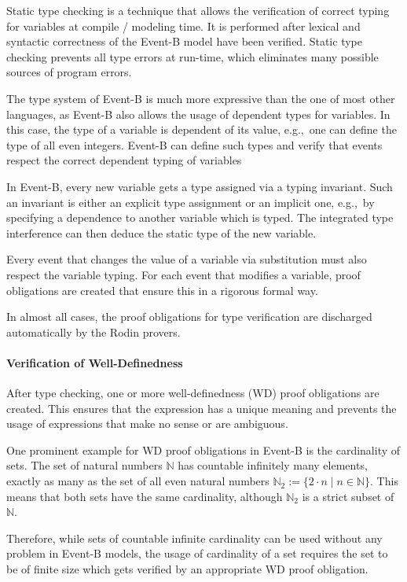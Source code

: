 Static type checking is a technique that allows the verification of correct
typing for variables at compile / modeling time. It is performed after lexical
and syntactic correctness of the Event-B model have been verified. Static type
checking prevents all type errors at run-time, which eliminates many possible
sources of program errors.

The type system of Event-B is much more expressive than the one of most other
languages, as Event-B also allows the usage of dependent types for variables. In
this case, the type of a variable is dependent of its value, e.g.,\ one can
define the type of all even integers. Event-B can define such types and verify
that events respect the correct dependent typing of variables

In Event-B, every new variable gets a type assigned via a typing invariant. Such
an invariant is either an explicit type assignment or an implicit one, e.g.,\ by
specifying a dependence to another variable which is typed. The integrated type
interference can then deduce the static type of the new variable.

Every event that changes the value of a variable via substitution must also
respect the variable typing. For each event that modifies a variable,  proof
obligations are created that ensure this in a rigorous formal way.

In almost all cases, the proof obligations for type verification are discharged
automatically by the Rodin provers.

\paragraph{Verification of Well-Definedness}
\label{sec:verif-well-defin}

After type checking, one or more well-definedness (WD) proof obligations are
created. This ensures that the expression has a unique meaning and prevents the
usage of expressions that make no sense or are ambiguous.

One prominent example for WD proof obligations in Event-B is the cardinality of
sets. The set of natural numbers $\mathbb{N}$ has countable infinitely many
elements, exactly as many as the set of all even natural numbers
$\mathbb{N}_2:=\{2\cdot n \mid n \in \mathbb{N}\}$. This means that both sets
have the same cardinality, although $\mathbb{N}_2$ is a strict subset of
$\mathbb{N}$.

Therefore, while sets of countable infinite cardinality can be used without any
problem in Event-B models, the usage of cardinality of a set requires the set to
be of finite size which gets verified by an appropriate WD proof obligation.

